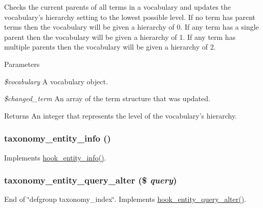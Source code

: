 Checks the current parents of all terms in a vocabulary and updates the vocabulary's hierarchy setting to the lowest possible level. If no term has parent terms then the vocabulary will be given a hierarchy of 0. If any term has a single parent then the vocabulary will be given a hierarchy of 1. If any term has multiple parents then the vocabulary will be given a hierarchy of 2.


\begin{DoxyParams}{Parameters}
\item[{\em \$vocabulary}]A vocabulary object. \item[{\em \$changed\_\-term}]An array of the term structure that was updated.\end{DoxyParams}
\begin{DoxyReturn}{Returns}
An integer that represents the level of the vocabulary's hierarchy. 
\end{DoxyReturn}
\hypertarget{taxonomy_8module_a581b0fd37814f5576b28e4bb340154bb}{
\subsubsection[{taxonomy\_\-entity\_\-info}]{\setlength{\rightskip}{0pt plus 5cm}taxonomy\_\-entity\_\-info ()}}
\label{taxonomy_8module_a581b0fd37814f5576b28e4bb340154bb}
Implements \hyperlink{group__hooks_gaf02318e9d0e8cdbf6d187b271b9969a8}{hook\_\-entity\_\-info()}. \hypertarget{taxonomy_8module_af966cf19abfe4bab47657aba9e494bc3}{
\subsubsection[{taxonomy\_\-entity\_\-query\_\-alter}]{\setlength{\rightskip}{0pt plus 5cm}taxonomy\_\-entity\_\-query\_\-alter (\$ {\em query})}}
\label{taxonomy_8module_af966cf19abfe4bab47657aba9e494bc3}
End of \char`\"{}defgroup taxonomy\_\-index\char`\"{}. Implements \hyperlink{group__hooks_ga22d97ef7297e17697cdaa8b32483f412}{hook\_\-entity\_\-query\_\-alter()}.

